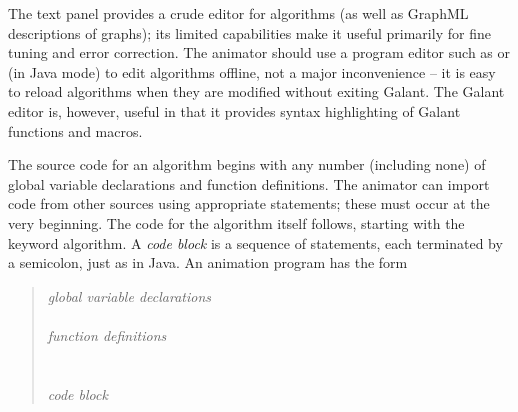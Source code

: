 The text panel provides a crude editor for algorithms (as well as GraphML
descriptions of graphs);
its limited capabilities make it useful primarily for fine tuning and error correction.
The animator should use a program editor such as  or
 (in Java mode) to edit algorithms offline,
not a major inconvenience -- it is easy to reload algorithms when they are modified
without exiting Galant.
The Galant editor is, however, useful in that it provides syntax highlighting of Galant
functions and macros.

The source code for an algorithm begins with any number (including none)
of global variable declarations and function definitions.
The animator can import code from other sources using appropriate
 statements; these must occur at the very beginning.
The code for the algorithm itself follows, starting with the keyword
\textsf{algorithm}.
A \emph{code block}
is a sequence of statements, each terminated by a semicolon, just as in
Java.
An animation program has the form
\begin{quote}
  \emph{global variable declarations}\\
  \\
  \emph{function definitions}\\
  \\
  \\
  \hspace*{2em}\emph{code block}\\
  \Code{\}}
\end{quote}

